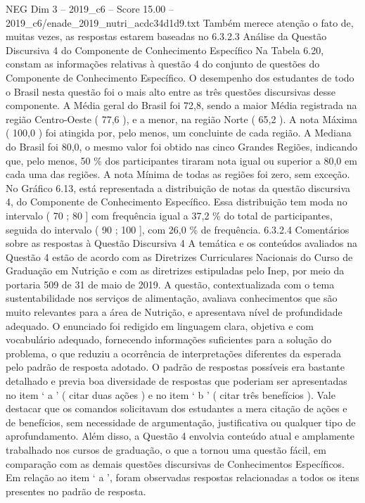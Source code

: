 \begin{textsample}{NEG Dim 3 – 2019\_c6 – Score 15.00 – 2019\_c6/enade\_2019\_nutri\_acdc34d1d9.txt}
Também merece atenção o fato de, muitas vezes, as respostas estarem baseadas no 6.3.2.3 Análise da Questão Discursiva 4 do Componente de Conhecimento Específico Na Tabela 6.20, constam as informações relativas à questão 4 do conjunto de questões do Componente de Conhecimento Específico.
O desempenho dos estudantes de todo o Brasil nesta questão foi o mais alto entre as três questões discursivas desse componente.
A Média geral do Brasil foi 72,8, sendo a maior Média registrada na região Centro-Oeste ( 77,6 ), e a menor, na região Norte ( 65,2 ).
A nota Máxima ( 100,0 ) foi atingida por, pelo menos, um concluinte de cada região.
A Mediana do Brasil foi 80,0, o mesmo valor foi obtido nas cinco Grandes Regiões, indicando que, pelo menos, 50 \% dos participantes tiraram nota igual ou superior a 80,0 em cada uma das regiões.
A nota Mínima de todas as regiões foi zero, sem exceção.
No Gráfico 6.13, está representada a distribuição de notas da questão discursiva 4, do Componente de Conhecimento Específico.
Essa distribuição tem moda no intervalo ( 70 ; 80 ] com frequência igual a 37,2 \% do total de participantes, seguida do intervalo ( 90 ; 100 ], com 26,0 \% de frequência. 6.3.2.4 Comentários sobre as respostas à Questão Discursiva 4 A temática e os conteúdos avaliados na Questão 4 estão de acordo com as Diretrizes Curriculares Nacionais do Curso de Graduação em Nutrição e com as diretrizes estipuladas pelo Inep, por meio da portaria 509 de 31 de maio de 2019.
A questão, contextualizada com o tema sustentabilidade nos serviços de alimentação, avaliava conhecimentos que são muito relevantes para a área de Nutrição, e apresentava nível de profundidade adequado.
O enunciado foi redigido em linguagem clara, objetiva e com vocabulário adequado, fornecendo informações suficientes para a solução do problema, o que reduziu a ocorrência de interpretações diferentes da esperada pelo padrão de resposta adotado.
O padrão de respostas possíveis era bastante detalhado e previa boa diversidade de respostas que poderiam ser apresentadas no item ‘ a ’ ( citar duas ações ) e no item ‘ b ’ ( citar três benefícios ).
Vale destacar que os comandos solicitavam dos estudantes a mera citação de ações e de benefícios, sem necessidade de argumentação, justificativa ou qualquer tipo de aprofundamento.
Além disso, a Questão 4 envolvia conteúdo atual e amplamente trabalhado nos cursos de graduação, o que a tornou uma questão fácil, em comparação com as demais questões discursivas de Conhecimentos Específicos.
Em relação ao item ‘ a ’, foram observadas respostas relacionadas a todos os itens presentes no padrão de resposta.

\end{textsample}
